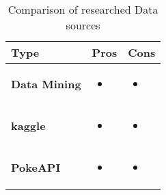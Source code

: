 \begin{table}[h]      
      \begin{tabular}{| m{3.5cm} | m{5cm} | m{5cm} |}
            \hline
            \textbf{Type} & \textbf{Pros} & \textbf{Cons} \\ 
            \hline
            \textbf{Data Mining} & 
            \begin{itemize}
                  \item 
            \end{itemize} & 
            \begin{itemize}
                  \item 
            \end{itemize} \\ 
            \hline
            \textbf{kaggle} & 
            \begin{itemize}
                  \item 
            \end{itemize} & 
            \begin{itemize}
                  \item 
            \end{itemize} \\ 
            \hline
            \textbf{PokeAPI} & 
            \begin{itemize}
                  \item 
            \end{itemize} & 
            \begin{itemize}
                  \item
            \end{itemize} \\ 
            \hline
      \end{tabular}
      \caption{Comparison of researched Data sources}
      \label{tab:datasource_comparison}
  \end{table}





